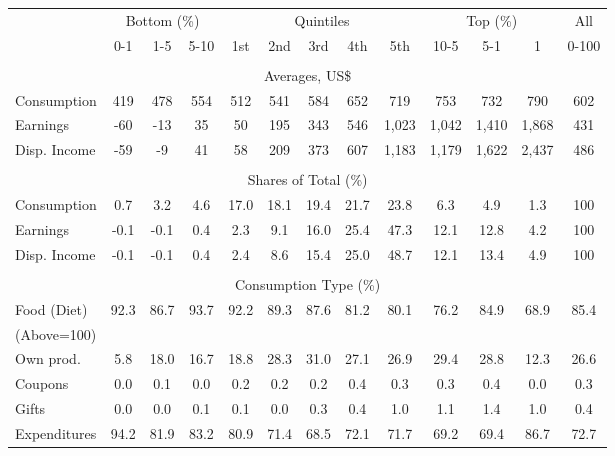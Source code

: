 \begin{tabular}{l c c c| c c c c c| c c c| c}
\toprule
&\multicolumn{3}{c|}{Bottom (\%)} & \multicolumn{5}{c|}{Quintiles} & \multicolumn{3}{c|}{Top (\%)} & All  \\
& 0-1 & 1-5 & 5-10 &  1st & 2nd & 3rd & 4th & 5th & 10-5 & 5-1 & 1 & 0-100 \\
\midrule \\
\multicolumn{13}{c}{Averages, US\$} \\
\midrule
Consumption  & 419  & 478  & 554  & 512  & 541  & 584  & 652  & 719  & 753  & 732  & 790  & 602 \\
Earnings         & -60 & -13 & 35 & 50 & 195 & 343 & 546 & 1,023 & 1,042 & 1,410 & 1,868 & 431 \\
Disp. Income & -59 & -9 & 41 & 58 & 209 & 373 & 607 & 1,183 & 1,179 & 1,622 & 2,437 & 486 \\
\midrule \\
\multicolumn{13}{c}{Shares of Total (\%)} \\
\midrule
Consumption  & 0.7   & 3.2   & 4.6   & 17.0   & 18.1   & 19.4   & 21.7   & 23.8   & 6.3   & 4.9   & 1.3   & 100 \\
Earnings         & -0.1  & -0.1  & 0.4  & 2.3  & 9.1  & 16.0  & 25.4  & 47.3  & 12.1  & 12.8  & 4.2  & 100 \\
Disp. Income & -0.1  & -0.1  & 0.4  & 2.4  & 8.6  & 15.4  & 25.0  & 48.7  & 12.1  & 13.4  & 4.9  & 100 \\
\midrule \\
\multicolumn{13}{c}{Consumption Type (\%)}  \\
\midrule
Food (Diet)  & 92.3 & 86.7 & 93.7 & 92.2 & 89.3 & 87.6 & 81.2 & 80.1 & 76.2 & 84.9 & 68.9 & 85.4 \\
(Above=100) & & & & & & & & & & & &  \\
\hspace{.3cm} Own prod.  & 5.8 & 18.0 & 16.7 & 18.8 & 28.3 & 31.0 & 27.1 & 26.9 & 29.4 & 28.8 & 12.3 & 26.6 \\
\hspace{.3cm} Coupons    & 0.0 & 0.1 & 0.0 & 0.2 & 0.2 & 0.2 & 0.4 & 0.3 & 0.3 & 0.4 & 0.0 & 0.3 \\
\hspace{.3cm} Gifts      & 0.0 & 0.0 & 0.1 & 0.1 & 0.0 & 0.3 & 0.4 & 1.0 & 1.1 & 1.4 & 1.0 & 0.4 \\
\hspace{.3cm} Expenditures  & 94.2 & 81.9 & 83.2 & 80.9 & 71.4 & 68.5 & 72.1 & 71.7 & 69.2 & 69.4 & 86.7 & 72.7 \\

\end{tabular}
